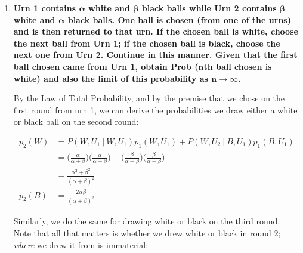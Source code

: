 \documentclass[10pt, oneside]{article}   	%
\theoremstyle{definition}
\begin{document}
\begin{enumerate}[label=3.\arabic*]
\begin{proof}
Establishing the desired result. The limit as $n \rightarrow + \infty$ is

\[ \lim_{n \rightarrow +\infty} p_n = \lim_{n \rightarrow +\infty} \bigg( \frac{\alpha}{\alpha + \beta} + \frac{\beta}{(\alpha + \beta)(\alpha + \beta + 1)^n} \bigg) = \boxed{\frac{\alpha}{\alpha + \beta}} \]

which is ordinarily $p_1$ without the premise that we are guaranteed to draw white on the first round from Urn 1. This means for big $n$ urns, the odds of picking white from the $n$-th urn are just as good as picking from the first urn.

\end{proof}

\item  \begin{tcolorbox}[
  colback=Cerulean!5!white,
  colframe=Cerulean!75!black]
\textbf{Urn 1 contains $\bm{\alpha}$ white and $\bm{\beta}$ black balls while Urn 2 contains $\bm{\beta}$ white and $\bm{\alpha}$ black balls. One ball is chosen (from one of the urns) and is then returned to that urn. If the chosen ball is white, choose the next ball from Urn 1; if the chosen ball is black, choose the next one from Urn 2. Continue in this manner. Given that the first ball chosen came from Urn 1, obtain Prob ($\bm{n}$th ball chosen is white) and also the limit of this probability as $\bm{n \rightarrow \infty}$.}
\end{tcolorbox}

By the Law of Total Probability, and by the premise that we chose on the first round from urn 1, we can derive the probabilities we draw either a white or black ball on the second round:

\begin{align*}
p_2 (W) &= P(W, U_1 \ | \ W, U_1) p_1 (W, U_1) + P(W, U_2 \ | \ B, U_1) p_1 (B, U_1) \\
&= \bigg( \frac{\alpha}{\alpha + \beta} \bigg) \bigg( \frac{\alpha}{\alpha + \beta} \bigg) + \bigg( \frac{\beta}{\alpha + \beta} \bigg) \bigg( \frac{\beta}{\alpha + \beta} \bigg) \\
&= \boxed{ \frac{\alpha^2 + \beta^2}{(\alpha + \beta)^2} } \\
p_2 (B) &= \boxed{ \frac{2\alpha \beta}{(\alpha + \beta)^2} }
\end{align*}

Similarly, we do the same for drawing white or black on the third round. Note that all that matters is whether we drew white or black in round 2; \textit{where} we drew it from is immaterial:


\end{enumerate}
\end{document}
